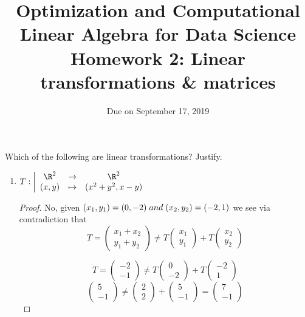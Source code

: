 \documentclass[11pt,nocut]{article}
\title{\vspace{-2.0cm}%
	Optimization and Computational Linear Algebra for Data Science\\
Homework 2: Linear transformations \& matrices}
\date{\vspace{-1cm}Due on September 17, 2019}
\begin{document}
\maketitle


\begin{problem}[2 points]
	Which of the following are linear transformations? Justify.
	\begin{enumerate}[label=\normalfont(\textbf{\alph*})]
		\item 
			$\displaystyle
			T: \left| 
			\begin{array}{ccc}
				\R^2 & \to & \R^2 \\
				(x,y) & \mapsto & (x^2+y^2, x-y)
			\end{array}
		\right.
		$\\
		
\begin{proof}
		No, given $(x_1,y_1) = (0,-2) \hspace{1mm} and \hspace{1mm} (x_2,y_2) = (-2,1)$ we see via contradiction that \\
		$$
		T = 
		\begin{pmatrix}
		x_1+x_2 \\
		y_1+y_2
		\end{pmatrix}
		\neq
		T
		\begin{pmatrix}
		x_1 \\
		y_1
		\end{pmatrix}
		+ T
		\begin{pmatrix}
		x_2 \\
		y_2
		\end{pmatrix}
		$$

		$$
		T = 
		\begin{pmatrix}
		-2 \\
		-1
		\end{pmatrix}
		\neq
		T
		\begin{pmatrix}
		0 \\
		-2
		\end{pmatrix}
		+ T
		\begin{pmatrix}
		-2 \\
		1
		\end{pmatrix}
		$$
				$$
		\begin{pmatrix}
		5 \\
		-1
		\end{pmatrix}
		\neq
		\begin{pmatrix}
		2 \\
		2
		\end{pmatrix}
		+ 
		\begin{pmatrix}
		5 \\
		-1
		\end{pmatrix}
		=
		\begin{pmatrix}
		7 \\
		-1
		\end{pmatrix}
		$$
		

\end{proof}
\end{enumerate}
\end{problem}
\end{document}
